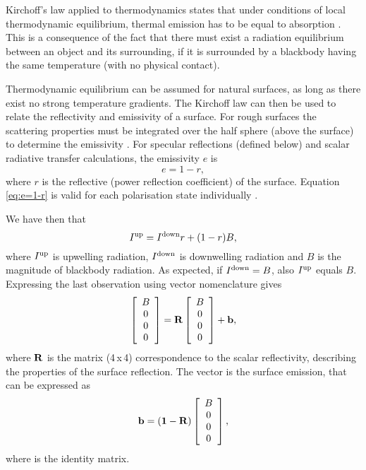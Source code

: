  Kirchoff's law applied to thermodynamics states that under conditions
 of local thermodynamic equilibrium, thermal emission has to be equal
 to absorption \citep[page 215]{ulaby:81}. This is a consequence of
 the fact that there must exist a radiation equilibrium between an
 object and its surrounding, if it is surrounded by a blackbody having
 the same temperature (with no physical contact). 
 
 Thermodynamic equilibrium can be assumed for natural surfaces, as
 long as there exist no strong temperature gradients. The Kirchoff law
 can then be used to relate the reflectivity and emissivity of a
 surface. For rough surfaces the scattering properties must be
 integrated over the half sphere (above the surface) to determine the
 emissivity \citep[see e.g.][Eq.\ 4.186]{ulaby:81}. For specular
 reflections (defined below) and scalar radiative transfer
 calculations, the emissivity $e$ is
 \begin{equation}
  \label{eq:e=1-r}
   e = 1 - r,
 \end{equation}
 where $r$ is the reflective (power reflection coefficient) of the
 surface.  Equation \ref{eq:e=1-r} is valid for each polarisation state
 individually \citep[Eq.\ 4.190a]{ulaby:81}.

 We have then that
 \begin{equation}
  I^\mathrm{up} = I^\mathrm{down}r + (1-r)B,
 \end{equation}
 where $I^\mathrm{up}$ is upwelling radiation, $I^\mathrm{down}$
 is downwelling radiation and $B$ is the magnitude of blackbody
 radiation. As expected, if $I^\mathrm{down}=B$, also
 $I^\mathrm{up}$ equals $B$.  Expressing the last observation using
 vector nomenclature gives
 \begin{equation}
   \left[\begin{array}{c} B \\ 0 \\0\\0 \end{array}\right] =
  \mathbf{R} \left[\begin{array}{c} B \\ 0 \\0\\0 \end{array}\right] + 
  \mathbf{b},
 \end{equation}
 where $\mathbf{R}$ is the matrix (4\,x\,4) correspondence to the
 scalar reflectivity, describing the properties of the surface
 reflection. The vector  is the surface emission, that
 can be expressed as
 \begin{equation}
  \label{eq:surface:bvector} 
  \mathbf{b} = (\mathbf{1}-\mathbf{R})
      \left[\begin{array}{c} B \\ 0 \\0\\0 \end{array}\right],
 \end{equation}
 where  is the identity matrix. 



